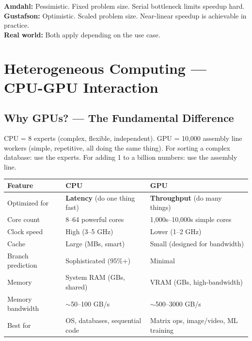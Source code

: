 \documentclass[11pt,a4paper]{article}
\begin{document}
\begin{keypoint}
\textbf{Amdahl:} Pessimistic. Fixed problem size. Serial bottleneck limits speedup hard.\\
\textbf{Gustafson:} Optimistic. Scaled problem size. Near-linear speedup is achievable in practice.\\
\textbf{Real world:} Both apply depending on the use case.
\end{keypoint}

\section{Heterogeneous Computing --- CPU-GPU Interaction}

\subsection{Why GPUs? --- The Fundamental Difference}

\begin{analogy}
CPU = 8 experts (complex, flexible, independent). GPU = 10,000 assembly line workers (simple, repetitive, all doing the same thing). For sorting a complex database: use the experts. For adding 1 to a billion numbers: use the assembly line.
\end{analogy}

\begin{center}
\begin{tabular}{L{4cm} L{4.5cm} L{5cm}}
\toprule
\textbf{Feature} & \textbf{CPU} & \textbf{GPU} \\
\midrule
Optimized for & \textbf{Latency} (do one thing fast) & \textbf{Throughput} (do many things) \\
Core count & 8--64 powerful cores & 1,000s--10,000s simple cores \\
Clock speed & High (3--5 GHz) & Lower (1--2 GHz) \\
Cache & Large (MBs, smart) & Small (designed for bandwidth) \\
Branch prediction & Sophisticated (95\%+) & Minimal \\
Memory & System RAM (GBs, shared) & VRAM (GBs, high-bandwidth) \\
Memory bandwidth & $\sim$50--100 GB/s & $\sim$500--3000 GB/s \\
Best for & OS, databases, sequential code & Matrix ops, image/video, ML training \\
\bottomrule
\end{tabular}
\end{center}
\end{document}
